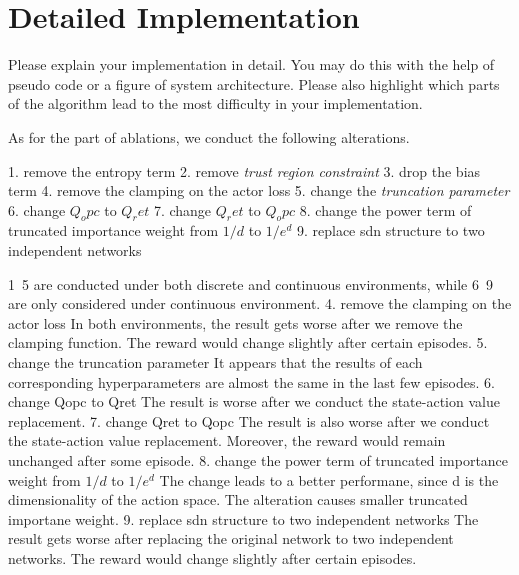 \section{Detailed Implementation}
\label{section:implementation}
Please explain your implementation in detail. You may do this with the help of pseudo code or a figure of system architecture. Please also highlight which parts of the algorithm lead to the most difficulty in your implementation.


As for the part of ablations, we conduct the following alterations. 

1. remove the entropy term
2. remove \emph{trust region constraint}
3. drop the bias term 
4. remove the clamping on the actor loss
5. change the \emph{truncation parameter}
6. change $Q_opc$ to $Q_ret$ 
7. change $Q_ret$ to $Q_opc$
8. change the power term of truncated importance weight from $1/d$ to $1 / e^d$
9. replace sdn structure to two independent networks

1~5 are conducted under both discrete and continuous environments, while 6~9 are only considered under continuous environment.
4. remove the clamping on the actor loss
In both environments, the result gets worse after we remove the clamping function. The reward would change slightly after certain episodes.
5. change the truncation parameter 
It appears that the results of each corresponding hyperparameters are almost the same in the last few episodes. 
6. change Qopc to Qret 
The result is worse after we conduct the state-action value replacement.
7. change Qret to Qopc 
The result is also worse after we conduct the state-action value replacement. Moreover, the reward would remain unchanged after some episode.
8. change the power term of truncated importance weight from $1/d$ to $1/e^d$
The change leads to a better performane, since d is the dimensionality of the action space. The alteration causes smaller truncated importane weight.
9. replace sdn structure to two independent networks
The result gets worse after replacing the original network to two independent networks. The reward would change slightly after certain episodes.
